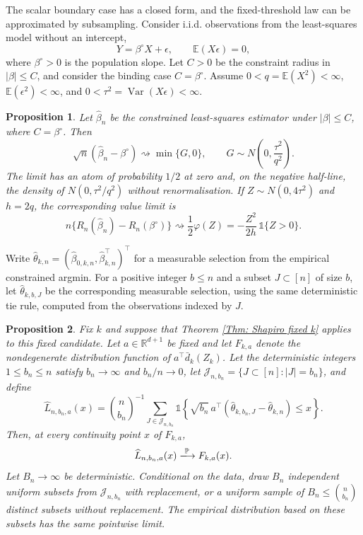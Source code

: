 \documentclass[12pt]{article}
\newenvironment{bluechange}{\begingroup\color[rgb]{0.00,0.00,1.00}}{\endgroup}
\newtheorem{proposition}{Proposition}
\theoremstyle{remark}
\theoremstyle{plain}
\begin{document}
\begin{bluechange}
The scalar boundary case has a closed form, and the fixed-threshold law can be approximated by subsampling. Consider i.i.d. observations from the least-squares model without an intercept,
\[
Y=\beta^\circ X+\epsilon,\qquad \mathbb E(X\epsilon)=0,
\]
where $\beta^\circ>0$ is the population slope. Let $C>0$ be the constraint radius in $|\beta|\le C$, and consider the binding case $C=\beta^\circ$. Assume $0<q=\mathbb E(X^2)<\infty$, $\mathbb E(\epsilon^2)<\infty$, and $0<\tau^2=\operatorname{Var}(X\epsilon)<\infty$.
\begin{proposition}\label{Prop: scalar boundary}
Let $\widehat\beta_n$ be the constrained least-squares estimator under $|\beta|\le C$, where $C=\beta^\circ$. Then
\[
\sqrt n(\widehat\beta_n-\beta^\circ)\rightsquigarrow\min\{G,0\},
\qquad G\sim N\left(0,\frac{\tau^2}{q^2}\right).
\]
The limit has an atom of probability $1/2$ at zero and, on the negative half-line, the density of $N(0,\tau^2/q^2)$ without renormalisation. If $Z\sim N(0,4\tau^2)$ and $h=2q$, the corresponding value limit is
\[
n\{R_n(\widehat\beta_n)-R_n(\beta^\circ)\}\rightsquigarrow
\frac12\varphi(Z)=-\frac{Z^2}{2h}\,\mathds{1}\{Z>0\}.
\]
\end{proposition}

Write $\widehat\theta_{k,n}=(\widehat\beta_{0,k,n},\widehat\beta_{k,n}^\top)^\top$ for a measurable selection from the empirical constrained argmin. For a positive integer $b\le n$ and a subset $J\subset[n]$ of size $b$, let $\widehat\theta_{k,b,J}$ be the corresponding measurable selection, using the same deterministic tie rule, computed from the observations indexed by $J$.

\begin{proposition}\label{Prop: subsampling fixed k}
Fix $k$ and suppose that Theorem \ref{Thm: Shapiro fixed k} applies to this fixed candidate. Let $a\in\mathbb R^{d+1}$ be fixed and let $F_{k,a}$ denote the nondegenerate distribution function of $a^\top\bar d_k(Z_k)$. Let the deterministic integers $1\le b_n\le n$ satisfy $b_n\to\infty$ and $b_n/n\to0$, let $\mathcal J_{n,b_n}=\{J\subset[n]:|J|=b_n\}$, and define
\[
\widehat L_{n,b_n,a}(x)
=\binom{n}{b_n}^{-1}\sum_{J\in\mathcal J_{n,b_n}}
\mathds 1\!\left\{\sqrt{b_n}\,a^\top(\widehat\theta_{k,b_n,J}-\widehat\theta_{k,n})\le x\right\}.
\]
Then, at every continuity point $x$ of $F_{k,a}$,
\[
\widehat L_{n,b_n,a}(x)\xlongrightarrow{\mathbb P}F_{k,a}(x).
\]
Let $B_n\to\infty$ be deterministic. Conditional on the data, draw $B_n$ independent uniform subsets from $\mathcal J_{n,b_n}$ with replacement, or a uniform sample of $B_n\le\binom n{b_n}$ distinct subsets without replacement. The empirical distribution based on these subsets has the same pointwise limit.
\end{proposition}


\end{bluechange}
\end{document}
